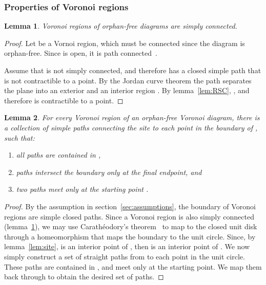 \documentclass[11pt]{article}
\newtheorem{lemma}{Lemma}
\begin{document}
\subsubsection{Properties of Voronoi regions}



\begin{lemma}\label{lem:regionSC}
Voronoi regions of orphan-free diagrams are simply connected.
\end{lemma}

\begin{proof}
Let  be a Vornoi region, which must be connected since the diagram is orphan-free. 
Since  is open, it is path connected~\cite[p.\ 158]{munkres2000topology}.



Assume that  is not simply connected, 
	and therefore has a closed simple path  that is not contractible to a point. 
By the Jordan curve theorem the path  separates the plane into an exterior and an interior region . 
By lemma~\ref{lem:RSC}, , and therefore  is contractible to a point. 
\end{proof}




\begin{lemma}\label{lem:regionpath}
For every Voronoi region  of an orphan-free Voronoi diagram, 
there is a collection of simple paths connecting the site  to each point in the boundary of , 
	 such that:
\begin{enumerate}
	\item all paths are contained in ,
	\item paths intersect the boundary  only at the final endpoint, and 
	\item two paths meet only at the starting point .  
	\end{enumerate}
\end{lemma}
\begin{proof}
By the assumption in section~\ref{sec:assumptions}, the boundary of Voronoi regions are simple closed paths. 
Since a Voronoi region  is also simply connected (lemma~\ref{lem:regionSC}), we may use Carath\'eodory's theorem~\cite{conformal}
	to map  to the closed unit disk  through a homeomorphism   
	that maps the boundary  to the unit circle. 
Since, by lemma~\ref{lem:site},  is an interior point of , 
	then  is an interior point of . 
We now simply construct a set of straight paths from  to each point in the unit circle. 
These paths are contained in , and meet only at the starting point. 
We map them back through  to obtain the desired set of paths. 
\end{proof}
\end{document}
